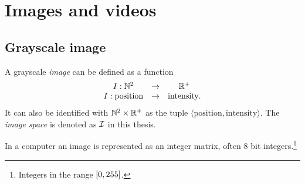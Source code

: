 

\section{Images and videos}
\subsection{Grayscale image}
\begin{definition}

  A grayscale \emph{image} can be defined as a function
  \begin{equation}
    \begin{array}{ccc}
      I : \mathbb{N}^2 &\rightarrow& \mathbb{R}^+\\
      I : \text{position}&\rightarrow&\text{intensity}.
    \end{array}
  \end{equation}
  It can also be identified with $\mathbb{N}^2\times \mathbb{R}^+$ as the tuple
  $\langle \text{position}, \text{intensity}\rangle$. The \emph{image
    space} is denoted as $\mathcal{I}$ in this thesis.

  In a computer an image is represented as an integer matrix, often 8
  bit integers.\footnote{Integers in the range $\left[0, 255\right]$.}
\end{definition}

%

